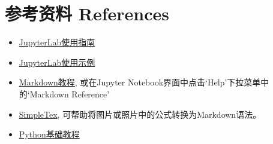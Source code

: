 \documentclass{article}
\begin{document}
\section*{参考资料 References}\label{sec:ref}
\begin{itemize}
  \item \href{https://jupyterlab.readthedocs.io/en/latest/user/}{JupyterLab使用指南}
  \item \href{https://medium.com/@tuenguyends/start-your-first-project-with-jupyter-lab-84f5b78b4522#:~:text=Create%20your%20first%20notebook}{JupyterLab使用示例}
  \item \href{https://markdown.com.cn/}{Markdown教程}, 或在Jupyter Notebook界面中点击`Help'下拉菜单中的`Markdown Reference'
  \item \href{https://simpletex.cn/ai/latex_ocr}{SimpleTex}, 可帮助将图片或照片中的公式转换为Markdown语法。
  \item \href{https://liaoxuefeng.com/books/python/basic/index.html}{Python基础教程}
\end{itemize}
\end{document}
